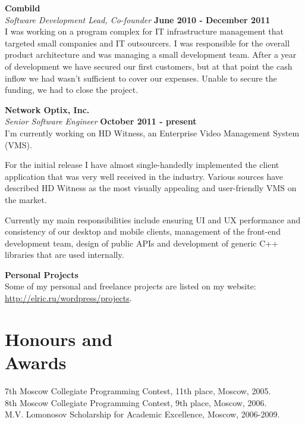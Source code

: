 \documentclass[margin,line]{CV}
\begin{document}
\begin{resume}
	\textbf{Combild} \vspace{2mm}\\\vspace{1mm}%
	\textsl{Software Development Lead, Co-founder} \hfill \textbf{June 2010 - December 2011}\\
    I was working on a program complex for IT infrastructure management that targeted small companies and IT outsourcers. I was responsible for the overall product architecture and was managing a small development team. After a year of development we have secured our first customers, but at that point the cash inflow we had wasn't sufficient to cover our expenses. Unable to secure the funding, we had to close the project.

    \textbf{Network Optix, Inc.} \vspace{2mm}\\\vspace{1mm}%
    \textsl{Senior Software Engineer} \hfill \textbf{October 2011 - present}\\
    I'm currently working on HD Witness, an Enterprise Video Management System (VMS). 
    
    For the initial release I have almost single-handedly implemented the client application that was very well received in the industry. Various sources have described HD Witness as the most visually appealing and user-friendly VMS on the market. 
    
    Currently my main responsibilities include ensuring UI and UX performance and consistency of our desktop and mobile clients, management of the front-end development team, design of public APIs and development of generic C++ libraries that are used internally.
    
	\textbf{Personal Projects} \vspace{2mm}\\\vspace{1mm}%
	Some of my personal and freelance projects are listed on my website: \url{http://elric.ru/wordpress/projects}.

    \pagebreak
    
    \section{\mysidestyle Honours and\\Awards}
    7th Moscow Collegiate Programming Contest, 11th place, Moscow, 2005.                            \vspace{1mm}\\%
    8th Moscow Collegiate Programming Contest, 9th place, Moscow, 2006.                             \vspace{1mm}\\%
    M.V. Lomonosov Scholarship for Academic Excellence, Moscow, 2006-2009.



\end{resume}
\end{document}

